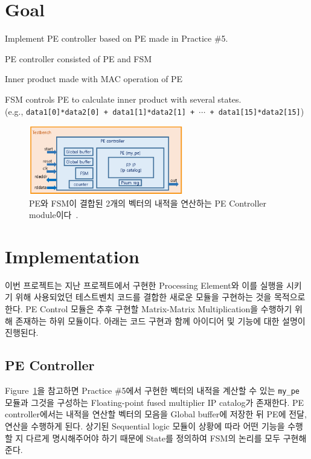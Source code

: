 \documentclass{article}
\begin{document}
\pagestyle{fancy}

\section*{Goal}

\begin{itemize*}
\item Implement PE controller based on PE made in Practice \#5.
\begin{itemize*}
\item PE controller consisted of PE and FSM
\item Inner product made with MAC operation of PE
\end{itemize*}
\item FSM controls PE to calculate inner product with several states. \\
(e.g., \texttt{data1[0]*data2[0] + data1[1]*data2[1] + $\cdots$ + data1[15]*data2[15]})
\end{itemize*}
\begin{figure}[ht]
	\centering
	\includegraphics[width=0.6\textwidth]{fig/fig1.png}
\caption{PE와 FSM이 결합된 2개의 벡터의 내적을 연산하는 PE Controller module이다~\cite{lab6}.}
\label{fig1}
\end{figure}

\section{Implementation}
이번 프로젝트는 지난 프로젝트에서 구현한 Processing Element와 이를 실행을 시키기 위해 사용되었던 테스트벤치 코드를 결합한 새로운 모듈을 구현하는 것을 목적으로 한다. PE Control 모듈은 추후 구현할 Matrix-Matrix Multiplication을 수행하기 위해 존재하는 하위 모듈이다. 아래는 코드 구현과 함께 아이디어 및 기능에 대한 설명이 진행된다.

\subsection{PE Controller}
Figure~\ref{fig1}을 참고하면 Practice \#5에서 구현한 벡터의 내적을 계산할 수 있는 \texttt{my\_pe} 모듈과 그것을 구성하는 Floating-point fused multiplier IP catalog가 존재한다. PE controller에서는 내적을 연산할 벡터의 모음을 Global buffer에 저장한 뒤 PE에 전달, 연산을 수행하게 된다. 상기된 Sequential logic 모듈이 상황에 따라 어떤 기능을 수행할 지 다르게 명시해주어야 하기 때문에 State를 정의하여 FSM의 논리를 모두 구현해준다.\\
\end{document}
